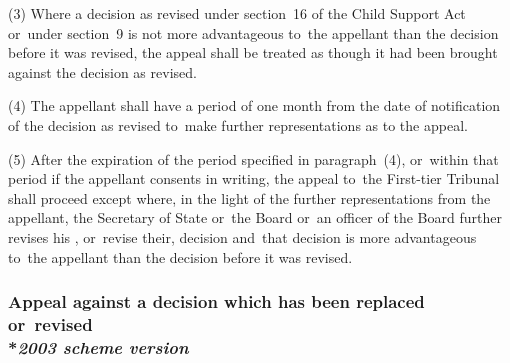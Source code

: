 \documentclass[12pt,a4paper]{article}
\begin{document}
(3) Where a decision as revised under section~16 of the Child Support Act or~under section~9 is not more advantageous to~the appellant than the decision before it was revised, the appeal shall be treated as though it had been brought against the decision as revised.

(4) The appellant shall have a period of one month from the date of notification of the decision as revised to~make further representations as to the appeal.

(5) After the expiration of the period specified in paragraph~(4), or~within that period if the appellant consents in writing, the appeal to~the 
First-tier Tribunal  %
shall proceed except where, in the light of the further representations from the appellant, the Secretary of State
or~the Board or~an officer of the Board  %
further revises his%
, or~revise their,  %
decision and~that decision is more advantageous to~the appellant than the decision before it was revised.


\subsubsection[30. Appeal against a decision which has been replaced or~revised --- \emph{2003 scheme version}]{Appeal against a decision which has been replaced or~revised\\*\emph{2003 scheme version}}
\end{document}
